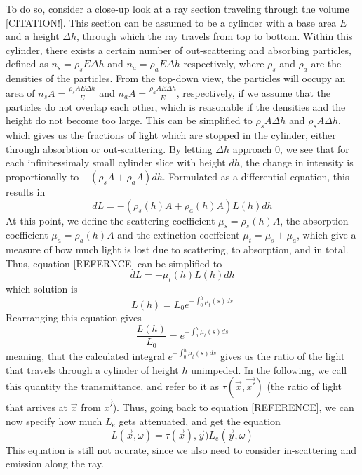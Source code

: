 To do so, consider a close-up look at a ray section traveling through the volume [CITATION!].
This section can be assumed to be a cylinder with a base area $E$ and a height $\Delta h$, through which the ray travels from top to bottom.
Within this cylinder, there exists a certain number of out-scattering and absorbing particles, defined as $n_s={\rho}_sE{\Delta}h$ and $n_a={\rho}_aE{\Delta}h$ respectively, where ${\rho}_s$ and ${\rho}_a$ are the densities of the particles.
From the top-down view, the particles will occupy an area of ${n_sA}=\frac{{\rho}_sAE{\Delta}h}{E}$ and ${n_aA}=\frac{{\rho}_aAE{\Delta}h}{E}$, respectively, if we assume that the particles do not overlap each other, which is reasonable if the densities and the height do not become too large.
This can be simplified to ${\rho}_sA{\Delta}h$ and ${\rho}_sA{\Delta}h$, which gives us the fractions of light which are stopped in the cylinder, either through absorbtion or out-scattering. By letting $\Delta h$ approach 0, we see that for each infinitessimaly small cylinder slice with height $dh$, the change in intensity is proportionally to $-({\rho}_sA + {\rho}_aA)dh$.
Formulated as a differential equation, this results in
\begin{equation}
dL = -({\rho}_s(h)A + {\rho}_a(h)A)L(h)dh
\end{equation}
At this point, we define the scattering coefficient ${\mu}_s ={\rho}_s(h)A $, the absorption coefficient ${\mu}_a = {\rho}_a(h)A$ and the extinction coeffcient ${\mu}_t = {\mu}_s +{\mu}_a$, which give a measure of how much light is lost due to scattering, to absorption, and in total. Thus, equation [REFERNCE] can be simplified to
\begin{equation}
dL = - {\mu}_t(h)L(h)dh
\end{equation}
which solution is
\begin{equation}
L(h) = L_0e^{-\int_{0}^{h} {\mu}_t(s)ds}
\end{equation}
Rearranging this equation gives
\begin{equation}
\frac{L(h)}{L_0} = e^{-\int_{0}^{h} {\mu}_t(s)ds}
\end{equation}
meaning, that the calculated integral $e^{-\int_{0}^{h} {\mu}_t(s)ds}$ gives us the ratio of the light that travels through a cylinder of height $h$ unimpeded. In the following, we call this quantity the transmittance, and refer to it as $\tau(\vec{x}, \vec{x'})$ (the ratio of light that arrives at $\vec{x}$ from $\vec{x'}$).
Thus, going back to equation [REFERENCE], we can now specify how much $L_e$ gets attenuated, and get the equation
\begin{equation}
L(\vec{x},\omega ) =\tau(\vec{x}), \vec{y}) L_e(\vec{y}, \omega )
\end{equation}
This equation is still not acurate, since we also need to consider in-scattering and emission along the ray.
